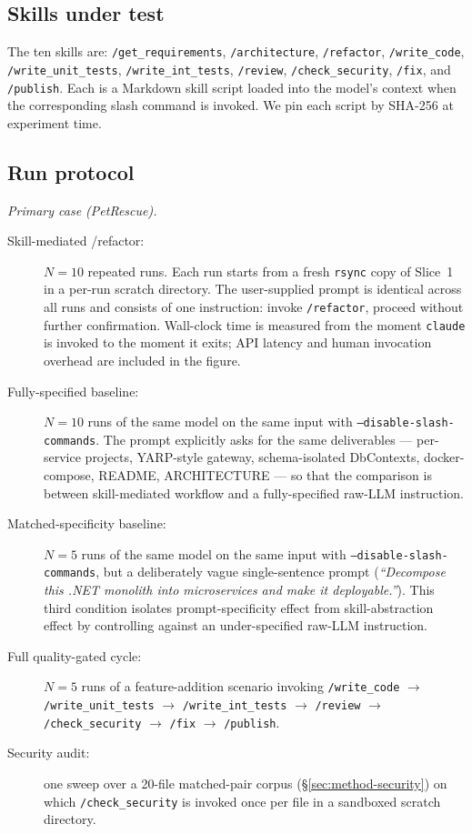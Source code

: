 \documentclass[journal]{IEEEtran}
\begin{document}
\subsection{Skills under test}
The ten skills are: \texttt{/get\_requirements}, \texttt{/architecture},
\texttt{/refactor}, \texttt{/write\_code}, \texttt{/write\_unit\_tests},
\texttt{/write\_int\_tests}, \texttt{/review}, \texttt{/check\_security},
\texttt{/fix}, and \texttt{/publish}. Each is a Markdown skill script
loaded into the model's context when the corresponding slash command
is invoked. We pin each script by SHA-256 at experiment time.

\subsection{Run protocol}
\label{sec:method-runs}

\textit{Primary case (PetRescue).}
\begin{description}
  \item[Skill-mediated /refactor:] $N=10$ repeated runs. Each run
        starts from a fresh \texttt{rsync} copy of Slice~1 in a
        per-run scratch directory. The user-supplied prompt is
        identical across all runs and consists of one instruction:
        invoke \texttt{/refactor}, proceed without further
        confirmation. Wall-clock time is measured from the moment
        \texttt{claude} is invoked to the moment it exits; API
        latency and human invocation overhead are included in the
        figure.
  \item[Fully-specified baseline:] $N=10$ runs of the same model on
        the same input with \texttt{--disable-slash-commands}. The
        prompt explicitly asks for the same deliverables ---
        per-service projects, YARP-style gateway, schema-isolated
        DbContexts, docker-compose, README, ARCHITECTURE --- so
        that the comparison is between skill-mediated workflow and
        a fully-specified raw-LLM instruction.
  \item[Matched-specificity baseline:] $N=5$ runs of the same model
        on the same input with \texttt{--disable-slash-commands},
        but a deliberately vague single-sentence prompt
        (\textit{``Decompose this .NET monolith into microservices
        and make it deployable.''}). This third condition isolates
        prompt-specificity effect from skill-abstraction effect by
        controlling against an under-specified raw-LLM instruction.
  \item[Full quality-gated cycle:] $N=5$ runs of a feature-addition
        scenario invoking \texttt{/write\_code} $\to$
        \texttt{/write\_unit\_tests} $\to$
        \texttt{/write\_int\_tests} $\to$ \texttt{/review} $\to$
        \texttt{/check\_security} $\to$ \texttt{/fix} $\to$
        \texttt{/publish}.
  \item[Security audit:] one sweep over a 20-file matched-pair
        corpus (\S\ref{sec:method-security}) on which
        \texttt{/check\_security} is invoked once per file in a
        sandboxed scratch directory.
\end{description}
\end{document}
